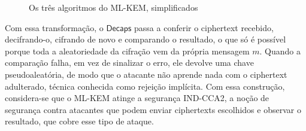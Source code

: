 \documentclass[12pt,a4paper]{article}
\newcommand{\fonte}[1]{\par\vspace{4pt}{\small Fonte: #1}}
\begin{document}
\begin{figure}[H]
\centering
\caption{Os três algoritmos do ML-KEM, simplificados}
\label{fig:algos}
\fonte{Adaptado de NIST (2024).}
\end{figure}

Com essa transformação, o $\mathsf{Decaps}$ passa a conferir o ciphertext
recebido, decifrando-o, cifrando de novo e comparando o resultado, o que
só é possível porque toda a aleatoriedade da cifração vem da própria
mensagem $m$. Quando a comparação falha, em vez de sinalizar o erro, ele
devolve uma chave pseudoaleatória, de modo que o atacante não aprende nada
com o ciphertext adulterado, técnica conhecida como rejeição implícita. Com
essa construção, considera-se que o ML-KEM atinge a segurança IND-CCA2, a noção de segurança
contra atacantes que podem enviar ciphertexts escolhidos e observar o
resultado, que cobre esse tipo de ataque.
\end{document}
